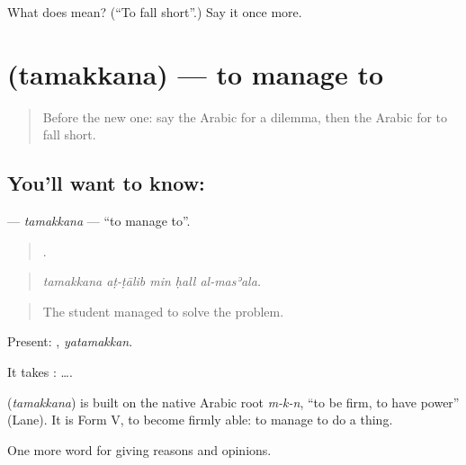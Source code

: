 \begin{tcolorbox}[breakable,colback=teal!4,colframe=teal!35!black,title={Before you move on}]
What does  mean? (\textquotedblleft{}To fall short\textquotedblright{}.) Say it once more.
\end{tcolorbox}
\section[\texorpdfstring{\ar{تمكن} (tamakkana)}{تمكن (tamakkana)}]{ (tamakkana) — to manage to}

\label{lesson:AR-C372-tamakkana}



\begin{quote}
Before the new one: say the Arabic for a dilemma, then the Arabic for to fall short.
\end{quote}

\subsection*{You'll want to know: }
\textbf{} — \emph{tamakkana} — \textquotedblleft{}to manage to\textquotedblright{}.

\begin{quote}
    .
\end{quote}

\begin{quote}
\emph{tamakkana aṭ-ṭālib min ḥall al-masʾala.}
\end{quote}

\begin{quote}
The student managed to solve the problem.
\end{quote}

Present: , \emph{yatamakkan}.

It takes :   ….

\begin{cousinweb}
\textbf{} (\emph{tamakkana}) is built on the native Arabic root \emph{m-k-n}, \textquotedblleft{}to be firm, to have power\textquotedblright{} (Lane). It is Form V, to become firmly able: to manage to do a thing.
\end{cousinweb}

\begin{grammarlens}[title={What you've built}]
One more word for giving reasons and opinions.
\end{grammarlens}

